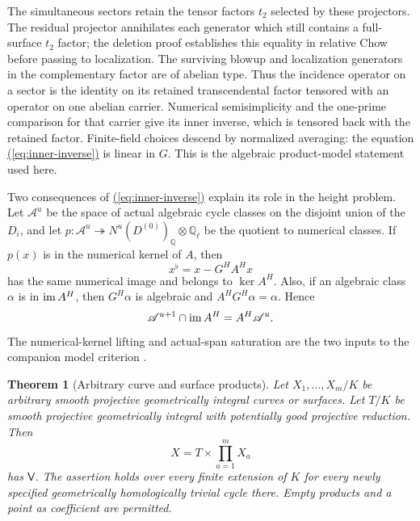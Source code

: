 \documentclass[11pt,a4paper]{article}
\newtheorem{theorem}{Theorem}[section]
\theoremstyle{definition}
\theoremstyle{remark}\newtheorem{remark}[theorem]{Remark}
\numberwithin{equation}{section}
\newcommand{\Q}{\mathbb Q}\newcommand{\R}{\mathbb R}\newcommand{\C}{\mathbb C}
\renewcommand{\eqref}[1]{\hyperref[#1]{\textcolor{equationlink}{(\ref*{#1})}}}
\begin{document}
The simultaneous sectors retain the tensor factors $t_2$ selected by
these projectors. The residual projector annihilates each generator
which still contains a full-surface $t_2$ factor; the deletion proof
establishes this equality in relative Chow before passing to
localization. The surviving blowup and localization generators
in the complementary factor are of abelian type. Thus the incidence
operator on a sector is the identity on its retained transcendental
factor tensored with an operator on one abelian carrier. Numerical
semisimplicity and the one-prime comparison for that carrier give its
inner inverse, which is tensored back with the retained factor.
Finite-field choices descend by normalized averaging: the equation
\eqref{eq:inner-inverse} is linear in $G$. This is the algebraic
product-model statement used here.

Two consequences of \eqref{eq:inner-inverse} explain its role in the
height problem. Let $\mathscr A^u$ be the space of actual algebraic
cycle classes on the disjoint union of the $D_i$, and let
$p:\mathscr A^u\twoheadrightarrow N^u(D^{(0)})_\Q\otimes\Q_\ell$
be the quotient to numerical classes. If $p(x)$ is in the numerical
kernel of $A$, then
\begin{equation}\label{eq:numerical-correction}
 x^\flat=x-G^HA^Hx
\end{equation}
has the same numerical image and belongs to $\ker A^H$. Also,
if an algebraic class $\alpha$ is in $\operatorname{im} A^H$, then $G^H\alpha$
is algebraic and $A^HG^H\alpha=\alpha$. Hence
\begin{equation}\label{eq:image-saturation}
 \mathscr A^{u+1}\cap\operatorname{im} A^H=A^H\mathscr A^u.
\end{equation}
The numerical-kernel lifting and actual-span saturation are the two
inputs to the companion model criterion \cite{InternalModel}.

\begin{theorem}[Arbitrary curve and surface products]\label{thm:products}
Let $X_1,\ldots,X_m/K$ be arbitrary smooth projective geometrically
integral curves or surfaces. Let $T/K$ be smooth projective
geometrically integral with potentially good projective reduction. Then
\[
 X=T\times\prod_{a=1}^mX_a
\]
has $\mathsf V$. The assertion holds over every finite extension of
$K$ for every newly specified geometrically homologically trivial
cycle there. Empty products and a point as coefficient are permitted.
\end{theorem}
\end{document}
